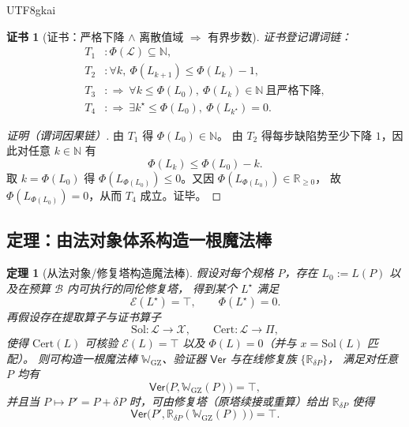 \documentclass[12pt]{article}
\newtheorem{theorem}{定理}[section]
\newtheorem{Certificate}{证书}[section]
\newcommand{\RR}{\mathbb{R}}
\newcommand{\NN}{\mathbb{N}}
\newcommand{\LawSpace}{\ensuremath{\mathcal{L}}}
\begin{document}
\begin{CJK*}{UTF8}{gkai}
\begin{Certificate}[证书：严格下降 $\wedge$ 离散值域 $\Rightarrow$ 有界步数]
\label{cert:magic-wand-discrete-termination}
证书登记谓词链：
\[
\begin{aligned}
  T_1 &: \Phi(\LawSpace)\subseteq\NN,\\
  T_2 &: \forall k,\ \Phi(L_{k+1})\le \Phi(L_k)-1,\\
  T_3 &: \Rightarrow\ \forall k\le \Phi(L_0),\ \Phi(L_k)\in\NN\ \text{且严格下降},\\
  T_4 &: \Rightarrow\ \exists k^\star\le \Phi(L_0),\ \Phi(L_{k^\star})=0.
\end{aligned}
\]
\end{Certificate}

\begin{proof}[证明（谓词因果链）]
由 $T_1$ 得 $\Phi(L_0)\in\NN$。
由 $T_2$ 得每步缺陷势至少下降 $1$，因此对任意 $k\in\NN$ 有
\[
  \Phi(L_k)\le \Phi(L_0)-k.
\]
取 $k=\Phi(L_0)$ 得 $\Phi(L_{\Phi(L_0)})\le 0$。又因 $\Phi(L_{\Phi(L_0)})\in\RR_{\ge 0}$，
故 $\Phi(L_{\Phi(L_0)})=0$，从而 $T_4$ 成立。证毕。
\end{proof}

\subsection{定理：由法对象体系构造一根魔法棒}
\label{sec:magic-wand-theorem-forward}

\begin{theorem}[从法对象/修复塔构造魔法棒]
\label{thm:magic-wand-from-law-object}
假设对每个规格 $P$，存在 $L_0:=L(P)$ 以及在预算 $\mathcal{B}$ 内可执行的同伦修复塔，
得到某个 $L^\star$ 满足
\[
  \mathcal{E}(L^\star)=\top,\qquad
  \Phi(L^\star)=0.
\]
再假设存在提取算子与证书算子
\[
  \mathrm{Sol}:\LawSpace\to\mathcal{X},\qquad
  \mathrm{Cert}:\LawSpace\to\Pi,
\]
使得 $\mathrm{Cert}(L)$ 可核验 $\mathcal{E}(L)=\top$ 以及 $\Phi(L)=0$（并与 $x=\mathrm{Sol}(L)$ 匹配）。
则可构造一根魔法棒 $\mathbb{W}_{\mathrm{GZ}}$、验证器 $\mathsf{Ver}$ 与在线修复族 $\{\mathbb{R}_{\delta P}\}$，
满足对任意 $P$ 均有
\[
  \mathsf{Ver}\!\bigl(P,\mathbb{W}_{\mathrm{GZ}}(P)\bigr)=\top,
\]
并且当 $P\mapsto P'=P+\delta P$ 时，可由修复塔（原塔续接或重算）给出 $\mathbb{R}_{\delta P}$ 使得
\[
  \mathsf{Ver}\!\bigl(P',\mathbb{R}_{\delta P}(\mathbb{W}_{\mathrm{GZ}}(P))\bigr)=\top.
\]
\end{theorem}


\end{CJK*}
\end{document}
